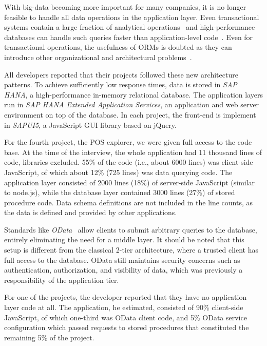 With big-data becoming more important for many companies, it is no longer feasible to handle all data operations in the application layer.
Even transactional systems contain a large fraction of analytical operations~\cite{krueger10:a_case_for_online} and high-performance databases can handle such queries faster than application-level code~\cite{plattner09:a_common_database_approach}.
Even for transactional operations, the usefulness of ORMs is doubted as they can introduce other organizational and architectural problems~\cite{neward06:the_vietnam_of_computer}.

All developers reported that their projects followed these new architecture patterns.
To achieve sufficiently low response times, data is stored in \emph{SAP HANA}, a high-performance in-memory relational database.
The application layers run in \emph{SAP HANA Extended Application Services}, an application and web server environment on top of the database.
In each project, the front-end is implement in \emph{SAPUI5}, a JavaScript GUI library based on jQuery.

For the fourth project, the POS explorer, we were given full access to the code base.
At the time of the interview, the whole application had 11 thousand lines of code, libraries excluded.
55\% of the code (i.e., about 6000 lines) was client-side JavaScript, of which about 12\% (725 lines) was data querying code.
The application layer consisted of 2000 lines (18\%) of server-side JavaScript (similar to node.js), while the database layer contained 3000 lines (27\%) of stored procedure code.
Data schema definitions are not included in the line counts, as the data is defined and provided by other applications.

Standards like \emph{OData}~\cite{chappell11:introducing_odata} allow clients to submit arbitrary queries to the database, entirely eliminating the need for a middle layer.
It should be noted that this setup is different from the classical 2-tier architecture, where a trusted client has full access to the database.
OData still maintains security concerns such as authentication, authorization, and visibility of data, which was previously a responsibility of the application tier.

For one of the projects, the developer reported that they have no application layer code at all.
The application, he estimated, consisted of 90\% client-side JavaScript, of which one-third was OData client code, and 5\% OData service configuration which passed requests to stored procedures that constituted the remaining 5\% of the project.

